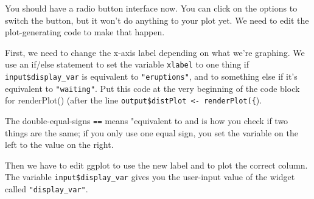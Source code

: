 \documentclass[
]{book}
\newenvironment{Shaded}{\begin{snugshade}}{\end{snugshade}}
\newcommand{\AttributeTok}[1]{\textcolor[rgb]{0.77,0.63,0.00}{#1}}
\newcommand{\CommentTok}[1]{\textcolor[rgb]{0.56,0.35,0.01}{\textit{#1}}}
\newcommand{\ControlFlowTok}[1]{\textcolor[rgb]{0.13,0.29,0.53}{\textbf{#1}}}
\newcommand{\FunctionTok}[1]{\textcolor[rgb]{0.00,0.00,0.00}{#1}}
\newcommand{\NormalTok}[1]{#1}
\newcommand{\OtherTok}[1]{\textcolor[rgb]{0.56,0.35,0.01}{#1}}
\newcommand{\SpecialCharTok}[1]{\textcolor[rgb]{0.00,0.00,0.00}{#1}}
\newcommand{\StringTok}[1]{\textcolor[rgb]{0.31,0.60,0.02}{#1}}
\begin{document}
You should have a radio button interface now. You can click on the options to switch the button, but it won't do anything to your plot yet. We need to edit the plot-generating code to make that happen.

First, we need to change the x-axis label depending on what we're graphing. We use an if/else statement to set the variable \texttt{xlabel} to one thing if \texttt{input\$display\_var} is equivalent to \texttt{"eruptions"}, and to something else if it's equivalent to \texttt{"waiting"}. Put this code at the very beginning of the code block for renderPlot() (after the line \texttt{output\$distPlot\ \textless{}-\ renderPlot(\{}).

\begin{Shaded}
\end{Shaded}

The double-equal-signs \texttt{==} means "equivalent to and is how you check if two things are the same; if you only use one equal sign, you set the variable on the left to the value on the right.

Then we have to edit ggplot to use the new label and to plot the correct column. The variable \texttt{input\$display\_var} gives you the user-input value of the widget called \texttt{"display\_var"}.

\begin{Shaded}
\end{Shaded}
\end{document}
